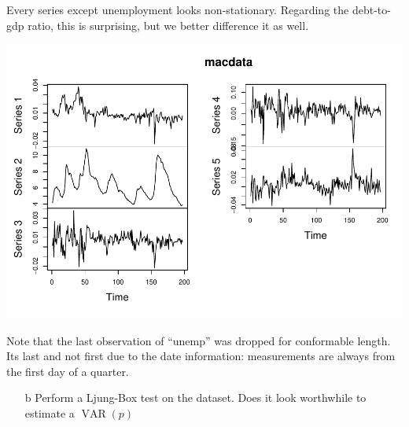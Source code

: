 \documentclass[12pt,a4paper]{article}
\newcommand{\VAR}{\operatorname{VAR}} %
\newenvironment{Shaded}{\begin{snugshade}}{\end{snugshade}}
\newcommand{\KeywordTok}[1]{\textcolor[rgb]{0.13,0.29,0.53}{\textbf{#1}}}
\newcommand{\NormalTok}[1]{#1}
\newcommand{\OperatorTok}[1]{\textcolor[rgb]{0.81,0.36,0.00}{\textbf{#1}}}
\newcommand{\StringTok}[1]{\textcolor[rgb]{0.31,0.60,0.02}{#1}}
\begin{document}
Every series except unemployment looks non-stationary. Regarding the
debt-to-gdp ratio, this is surprising, but we better difference it as
well.

\begin{Shaded}
\end{Shaded}

\includegraphics{solution_exercise_5_files/figure-latex/unnamed-chunk-4-1.pdf}

Note that the last observation of \enquote{unemp} was dropped for
conformable length. Its last and not first due to the date information:
measurements are always from the first day of a quarter.

\begin{itemize}
  \item[b] Perform a Ljung-Box test on the dataset. Does it look worthwhile to estimate a $\VAR(p)$
\end{itemize}
\end{document}
